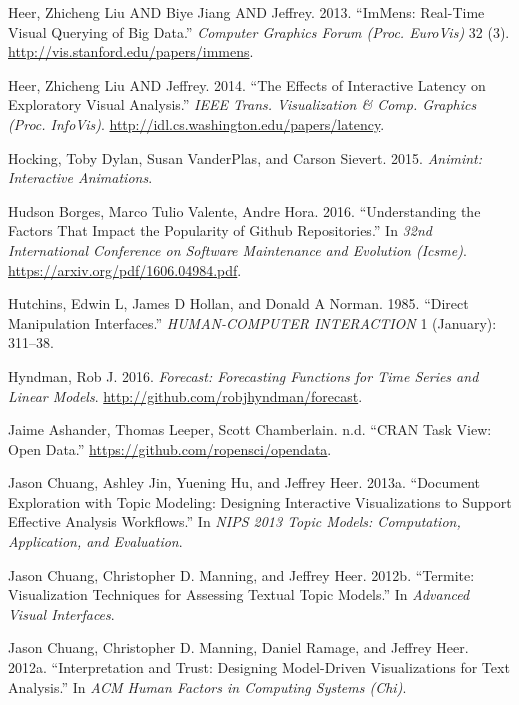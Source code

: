 \documentclass[12pt,]{isuthesis}
\begin{document}
\hypertarget{ref-2013-immens}{}
Heer, Zhicheng Liu AND Biye Jiang AND Jeffrey. 2013. ``ImMens: Real-Time
Visual Querying of Big Data.'' \emph{Computer Graphics Forum (Proc.
EuroVis)} 32 (3). \url{http://vis.stanford.edu/papers/immens}.

\hypertarget{ref-2014-latency}{}
Heer, Zhicheng Liu AND Jeffrey. 2014. ``The Effects of Interactive
Latency on Exploratory Visual Analysis.'' \emph{IEEE Trans.
Visualization \& Comp. Graphics (Proc. InfoVis)}.
\url{http://idl.cs.washington.edu/papers/latency}.

\hypertarget{ref-animint}{}
Hocking, Toby Dylan, Susan VanderPlas, and Carson Sievert. 2015.
\emph{Animint: Interactive Animations}.

\hypertarget{ref-stars}{}
Hudson Borges, Marco Tulio Valente, Andre Hora. 2016. ``Understanding
the Factors That Impact the Popularity of Github Repositories.'' In
\emph{32nd International Conference on Software Maintenance and
Evolution (Icsme)}. \url{https://arxiv.org/pdf/1606.04984.pdf}.

\hypertarget{ref-Hutchins:1985wu}{}
Hutchins, Edwin L, James D Hollan, and Donald A Norman. 1985. ``Direct
Manipulation Interfaces.'' \emph{HUMAN-COMPUTER INTERACTION} 1
(January): 311--38.

\hypertarget{ref-forecast}{}
Hyndman, Rob J. 2016. \emph{Forecast: Forecasting Functions for Time
Series and Linear Models}. \url{http://github.com/robjhyndman/forecast}.

\hypertarget{ref-OpenData}{}
Jaime Ashander, Thomas Leeper, Scott Chamberlain. n.d. ``CRAN Task View:
Open Data.'' \url{https://github.com/ropensci/opendata}.

\hypertarget{ref-2013-termite}{}
Jason Chuang, Ashley Jin, Yuening Hu, and Jeffrey Heer. 2013a.
``Document Exploration with Topic Modeling: Designing Interactive
Visualizations to Support Effective Analysis Workflows.'' In \emph{NIPS
2013 Topic Models: Computation, Application, and Evaluation}.

\hypertarget{ref-2012-termite}{}
Jason Chuang, Christopher D. Manning, and Jeffrey Heer. 2012b.
``Termite: Visualization Techniques for Assessing Textual Topic
Models.'' In \emph{Advanced Visual Interfaces}.

\hypertarget{ref-2012-trust}{}
Jason Chuang, Christopher D. Manning, Daniel Ramage, and Jeffrey Heer.
2012a. ``Interpretation and Trust: Designing Model-Driven Visualizations
for Text Analysis.'' In \emph{ACM Human Factors in Computing Systems
(Chi)}.
\end{document}
